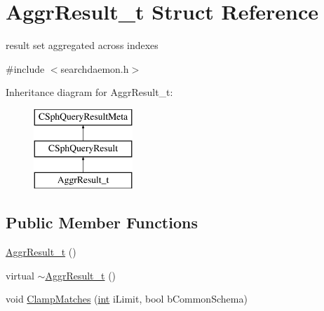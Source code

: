 \hypertarget{structAggrResult__t}{\section{Aggr\-Result\-\_\-t Struct Reference}
\label{structAggrResult__t}
}


result set aggregated across indexes  




{\ttfamily \#include $<$searchdaemon.\-h$>$}

Inheritance diagram for Aggr\-Result\-\_\-t\-:\begin{figure}[H]
\begin{center}
\leavevmode
\includegraphics[height=3.000000cm]{structAggrResult__t}
\end{center}
\end{figure}
\subsection*{Public Member Functions}
\begin{DoxyCompactItemize}
\item 
\hyperlink{structAggrResult__t_a3900745ffc037f0ddb3021f06aab8a8f}{Aggr\-Result\-\_\-t} ()
\item 
virtual \hyperlink{structAggrResult__t_ab3e2290a625323dd4f2ec0c1505b4f67}{$\sim$\-Aggr\-Result\-\_\-t} ()
\item 
void \hyperlink{structAggrResult__t_a5caaefcd75a186b3d0b97f50af834ef9}{Clamp\-Matches} (\hyperlink{sphinxexpr_8cpp_a4a26e8f9cb8b736e0c4cbf4d16de985e}{int} i\-Limit, bool b\-Common\-Schema)
\end{DoxyCompactItemize}
